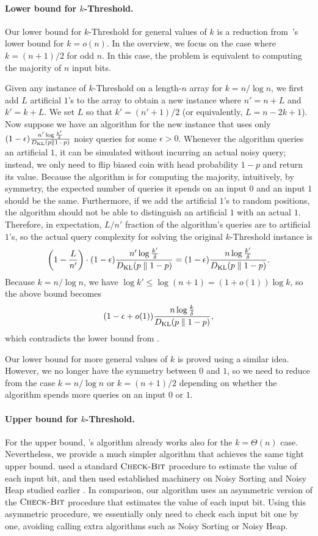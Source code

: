 \paragraph{Lower bound for $k$-Threshold.}
Our lower bound for $k$-Threshold for general values of $k$ is a reduction from~\cite{wang2024noisy}'s lower bound for $k = o(n)$. In the overview, we focus on the case where $k = (n + 1) / 2$ for odd $n$. In this case, the problem is equivalent to computing the majority of $n$ input bits.

Given any instance of $k$-Threshold on a length-$n$ array for $k = n / \log n$, we first add $L$ artificial $1$'s to the array to obtain a new instance where $n' = n + L$ and $k' = k + L$. We set $L$ so that $k' = (n' + 1) / 2$ (or equivalently, $L = n - 2k + 1$). Now suppose we have an algorithm for the new instance that uses only $(1-\epsilon) \frac{n' \log \frac{k'}{\delta}}{D_{\operatorname{\mathrm{KL}}}(p \parallel 1-p)}$ noisy queries for some $\epsilon > 0$. Whenever the algorithm queries an artificial $1$, it can be simulated without incurring an actual noisy query; instead, we only need to flip biased coin with head probability $1-p$ and return its value. Because the algorithm is for computing the majority, intuitively, by symmetry, the expected number of queries it spends on an input $0$ and an input $1$ should be the same. Furthermore, if we add the artificial $1$'s to random positions, the algorithm should not be able to distinguish an artificial $1$ with an actual $1$. Therefore, in expectation, $L / n'$ fraction of the algorithm's queries are to artificial $1$'s, so the actual query complexity for solving the original $k$-Threshold instance is
\[
\left(1-\frac{L}{n'}\right) \cdot (1-\epsilon) \frac{n' \log \frac{k'}{\delta}}{D_{\operatorname{\mathrm{KL}}}(p \parallel 1-p)} = (1-\epsilon)\frac{n \log \frac{k'}{\delta}}{D_{\operatorname{\mathrm{KL}}}(p \parallel 1-p)}.
\]
Because $k = n / \log n$, we have $\log k' \le \log(n + 1) = (1+o(1)) \log k$, so the above bound becomes
\[
 (1-\epsilon + o(1))\frac{n \log \frac{k}{\delta}}{D_{\operatorname{\mathrm{KL}}}(p \parallel 1-p)},
\]
which contradicts the lower bound from \cite{wang2024noisy}.

Our lower bound for more general values of $k$ is proved using a similar idea. However, we no longer have the symmetry between $0$ and $1$, so we need to reduce from the case $k = n / \log n$ or $k = (n + 1) / 2$ depending on whether the algorithm spends more queries on an input $0$ or $1$.


\paragraph{Upper bound for $k$-Threshold.}
For the upper bound, \cite{wang2024noisy}'s algorithm already works also for the $k = \Theta(n)$ case. Nevertheless, we provide a much simpler algorithm that achieves the same tight upper bound. \cite{wang2024noisy} used a standard $\textsc{Check-Bit}$ procedure to estimate the value of each input bit, and then used established machinery on Noisy Sorting and Noisy Heap studied earlier \cite{feige1994computing}. In comparison, our algorithm uses an asymmetric version of the $\textsc{Check-Bit}$ procedure that estimates the value of each input bit. Using this asymmetric procedure, we essentially only need to check each input bit one by one, avoiding calling extra algorithms such as Noisy Sorting or Noisy Heap.


